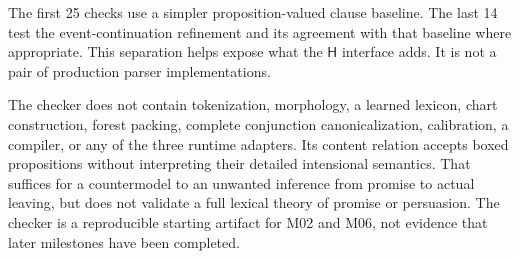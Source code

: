 \documentclass[11pt,a4paper]{article}
\newcommand{\HH}{\mathsf{H}}
\begin{document}
The first 25 checks use a simpler proposition-valued clause baseline. The
last 14 test the event-continuation refinement and its agreement with that
baseline where appropriate. This separation helps expose what the \(\HH\)
interface adds. It is not a pair of production parser implementations.

The checker does not contain tokenization, morphology, a learned lexicon,
chart construction, forest packing, complete conjunction canonicalization,
calibration, a compiler, or any of the three runtime adapters. Its content relation accepts
boxed propositions without interpreting their detailed intensional semantics.
That suffices for a countermodel to an unwanted inference from promise to
actual leaving, but does not validate a full lexical theory of promise or
persuasion. The checker is a reproducible starting artifact for M02 and M06,
not evidence that later milestones have been completed.
\end{document}
